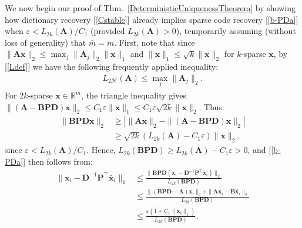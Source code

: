 \documentclass[9pt,twocolumn]{pnas-new}
\renewcommand{\eqref}[1]{\textnormal{[\ref{#1}]}}
\begin{document}


We now begin our proof of Thm.~\ref{DeterministicUniquenessTheorem} by showing how dictionary recovery \eqref{Cstable} already implies sparse code recovery \eqref{b-PDa} when \mbox{$\varepsilon < L_{2k}(\mathbf{A}) / C_1$} (provided $L_{2k}(\mathbf{A}) > 0$), temporarily assuming (without loss of generality) that $\bar m = m$. First, note that since $\|\mathbf{A}\mathbf{x}\|_2 \leq \max_j\|\mathbf{A}_j\|_2\|\mathbf{x}\|_1$ and $\|\mathbf{x}\|_1 \leq \sqrt{k} \|\mathbf{x}\|_2$ for $k$-sparse $\mathbf{x}$, by \eqref{Ldef} we have the following frequently applied inequality:
\begin{align}\label{delrho}
L_{2\mathcal{H}}(\mathbf{A}) %
\leq  \max_j\|\mathbf{A}_j\|_2.
\end{align}
For $2k$-sparse $\mathbf{x} \in \mathbb{R}^m$, the triangle inequality gives \mbox{$\|(\mathbf{A}-\mathbf{BPD})\mathbf{x}\|_2  \leq C_1\varepsilon \|\mathbf{x}\|_1 \leq C_1 \varepsilon \sqrt{2k}  \|\mathbf{x}\|_2$}. Thus:
\begin{align*}
\|\mathbf{BPD}\mathbf{x}\|_2 
&\geq | \|\mathbf{A}\mathbf{x}\|_2 - \|(\mathbf{A}-\mathbf{BPD})\mathbf{x}\|_2 | \\
&\geq \sqrt{2k} (L_{2k}(\mathbf{A}) -  C_1\varepsilon) \|\mathbf{x}\|_2,
\end{align*}
%
since $\varepsilon < L_{2k}(\mathbf{A}) / C_1$. Hence, $L_{2k}(\mathbf{BPD}) \geq L_{2k}(\mathbf{A}) - C_1\varepsilon  > 0$, and \eqref{b-PDa} then follows from:
\begin{align*}
\|\mathbf{x}_i - \mathbf{D}^{-1}\mathbf{P}^{\top}\mathbf{\bar x}_i \|_1
&\leq \frac{\|\mathbf{BPD}(\mathbf{x}_i - \mathbf{D}^{-1}\mathbf{P}^{\top}\mathbf{\bar x}_i)\|_2}{L_{2k}(\mathbf{BPD})} \\
&\leq \frac{\|(\mathbf{BPD} - \mathbf{A})\mathbf{x}_i\|_2 + \|\mathbf{A}\mathbf{x}_i - \mathbf{B}\mathbf{\bar x}_i\|_2}{L_{2k}(\mathbf{BPD})} \\
&\leq \frac{\varepsilon (1 + C_1 \|\mathbf{x}_i\|_1)}{L_{2k}(\mathbf{BPD})}.
\end{align*}
\end{document}
